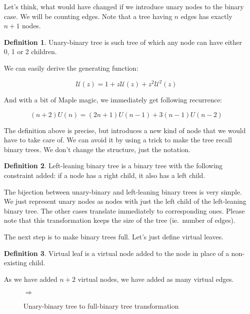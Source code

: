 \documentclass[final]{article}
\theoremstyle{definition}
\newtheorem{definition}{Definition}[subsection]
\theoremstyle{remark}
\newcommand{\gf}[1]{\ensuremath{\mathcal{#1}}}
\newcommand{\includeinlinesvg}[2]{\begin{minipage}{#1\textwidth}\end{minipage}}
\begin{document}
Let's think, what would have changed if we introduce unary nodes to the binary case\cite{motzkin}. We will be counting edges. Note that a tree having \(n\) edges has exactly \(n + 1\) nodes.

\begin{definition}
    Unary-binary tree is such tree of which any node can have either 0, 1 or 2 children.
\end{definition}

We can easily derive the generating function:

\[\gf{U}(z) = 1 + z\gf{U}(z) + z^2 \gf{U}^2(z)\]

And with a bit of Maple magic\cite{gfun}, we immediately get following recurrence:

\[(n + 2)U(n) = (2n + 1)U(n - 1) + 3(n - 1)U(n - 2)\]

The definition above is precise, but introduces a new kind of node that we would have to take care of. We can avoid it by using a trick to make the tree recall binary trees. We don't change the structure, just the notation.

\begin{definition}
    \label{def:unary_binary_2}
    Left-leaning binary tree is a binary tree with the following constraint added: if a node has a right child, it also has a left child.
\end{definition}

The bijection between unary-binary and left-leaning binary trees is very simple. We just represent unary nodes as nodes with just the left child of the left-leaning binary tree. The other cases translate immediately to corresponding ones. Please note that this transformation keeps the size of the tree (ie.~number of edges).

The next step is to make binary trees full. Let's just define virtual leaves.

\begin{definition}
    Virtual leaf is a virtual node added to the node in place of a non-existing child.
\end{definition}

As we have added \(n + 2\) virtual nodes, we have added as many virtual edges.

\begin{figure}[h]
    \centering
    \includeinlinesvg{.2}{unary_binary__base}%
    \(\Rightarrow\)%
    \includeinlinesvg{.3}{unary_binary__full}
    \caption{Unary-binary tree to full-binary tree transformation}
    \label{fig:unary_binary_transformation}
\end{figure}
\end{document}
